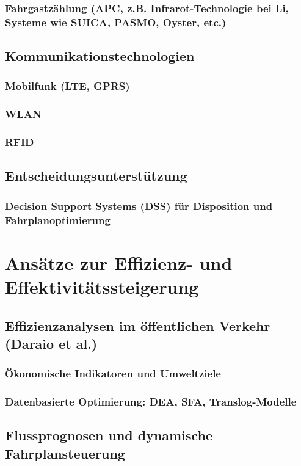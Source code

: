 \documentclass[ngerman]{seminarbeitrag} %
\begin{document}
\subsubsection{Fahrgastzählung (APC, z.B. Infrarot-Technologie bei Li, Systeme wie SUICA, PASMO, Oyster, etc.)}
\subsection{Kommunikationstechnologien}
\subsubsection{Mobilfunk (LTE, GPRS)}
\subsubsection{WLAN}
\subsubsection{RFID}
\subsection{Entscheidungsunterstützung}
\subsubsection{Decision Support Systems (DSS) für Disposition und Fahrplanoptimierung}

\pagebreak
\section{Ansätze zur Effizienz- und Effektivitätssteigerung}
\subsection{Effizienzanalysen im öffentlichen Verkehr (Daraio et al.)}
\subsubsection{Ökonomische Indikatoren und Umweltziele}
\subsubsection{Datenbasierte Optimierung: DEA, SFA, Translog-Modelle}
\subsection{Flussprognosen und dynamische Fahrplansteuerung}
\end{document}
